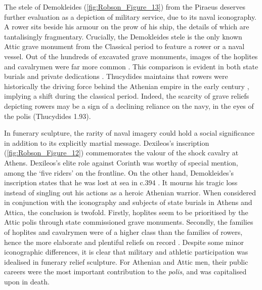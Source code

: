 The stele of Demokleides (\ref{fig:Robson_Figure_13}) from the Piraeus deserves further evaluation as a depiction of military service, due to its naval iconography. A rower sits beside his armour on the prow of his ship, the details of which are tantalisingly fragmentary.
Crucially, the Demokleides stele is the only known Attic grave monument from the Classical period to feature a rower or a naval vessel. Out of the hundreds of excavated grave monuments, images of the hoplites and cavalrymen were far more common \parencite[97]{Stupperich1994}.
This comparison is evident in both state burials and private dedications \parencite[97]{Stupperich1994}. Thucydides maintains that rowers were historically the driving force behind the Athenian empire in the early  century \BC, implying a shift during the classical period. Indeed, the scarcity of grave reliefs depicting rowers may be a sign of a declining reliance on the navy, in the eyes of the polis (Thucydides 1.93).

In funerary sculpture, the rarity of naval imagery could hold a social significance in addition to its explicitly martial message. Dexileos’s inscription (\ref{fig:Robson_Figure_12}) commemorates the valour of the shock cavalry at Athens.
Dexileos’s elite role against Corinth was worthy of special mention, among the \enquote*{five riders} on the frontline. On the other hand, Demokleides’s inscription states that he was lost at sea in c.394 \BC \parencite[197]{Wasserman1969}.
It mourns his tragic loss instead of singling out his actions as a heroic Athenian warrior. When considered in conjunction with the iconography and subjects of state burials in Athens and Attica, the conclusion is twofold. Firstly, hoplites seem to be prioritised by the Attic polis through state commissioned grave monuments. Secondly, the families of hoplites and cavalrymen were of a higher class than the families of rowers, hence the more elaborate and plentiful reliefs on record \parencite[97]{Stupperich1994}. Despite some minor iconographic differences, it is clear that military and athletic participation was idealised in funerary relief sculpture. For Athenian and Attic men, their public careers were the most important contribution to the \textit{polis}, and was capitalised upon in death.


